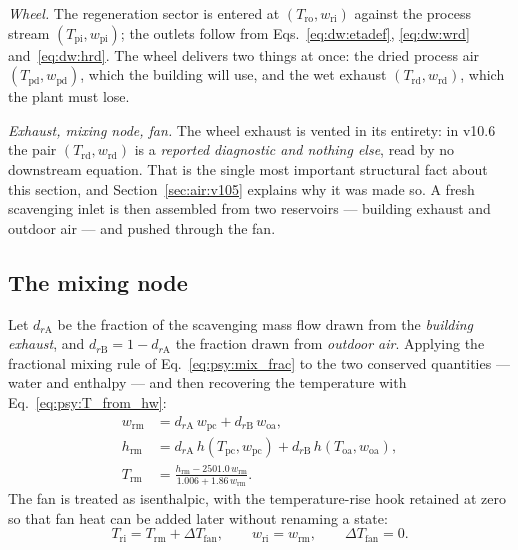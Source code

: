 \documentclass[11pt]{article}
\begin{document}
\emph{Wheel.} The regeneration sector is entered at
$(T_{\mathrm{ro}},w_{\mathrm{ri}})$ against the process stream
$(T_{\mathrm{pi}},w_{\mathrm{pi}})$; the outlets follow from
Eqs.~\eqref{eq:dw:etadef}, \eqref{eq:dw:wrd} and~\eqref{eq:dw:hrd}. The wheel
delivers two things at once: the dried process air
$(T_{\mathrm{pd}},w_{\mathrm{pd}})$, which the building will use, and the wet
exhaust $(T_{\mathrm{rd}},w_{\mathrm{rd}})$, which the plant must lose.

\emph{Exhaust, mixing node, fan.} The wheel exhaust is vented in its entirety:
in v10.6 the pair $(T_{\mathrm{rd}},w_{\mathrm{rd}})$ is a \emph{reported
diagnostic and nothing else}, read by no downstream equation. That is the
single most important structural fact about this section, and
Section~\ref{sec:air:v105} explains why it was made so. A fresh scavenging
inlet is then assembled from two reservoirs --- building exhaust and outdoor
air --- and pushed through the fan.

\subsection{The mixing node}
\label{sec:air:mix}

Let $d_{r\mathrm{A}}$ be the fraction of the scavenging mass flow drawn from
the \emph{building exhaust}, and $d_{r\mathrm{B}}=1-d_{r\mathrm{A}}$ the
fraction drawn from \emph{outdoor air}. Applying the fractional mixing rule
of Eq.~\eqref{eq:psy:mix_frac} to the two conserved quantities --- water and
enthalpy --- and then recovering the temperature with
Eq.~\eqref{eq:psy:T_from_hw}:
\begin{align}
w_{\mathrm{rm}} &= d_{r\mathrm{A}}\,w_{\mathrm{pc}}
                 + d_{r\mathrm{B}}\,w_{\mathrm{oa}},
\label{eq:air:mix_w}\\[2pt]
h_{\mathrm{rm}} &= d_{r\mathrm{A}}\,h(T_{\mathrm{pc}},w_{\mathrm{pc}})
                 + d_{r\mathrm{B}}\,h(T_{\mathrm{oa}},w_{\mathrm{oa}}),
\label{eq:air:mix_h}\\[2pt]
T_{\mathrm{rm}} &= \frac{h_{\mathrm{rm}} - 2501.0\,w_{\mathrm{rm}}}
                        {1.006 + 1.86\,w_{\mathrm{rm}}} .
\label{eq:air:mix_T}
\end{align}
The fan is treated as isenthalpic, with the temperature-rise hook retained at
zero so that fan heat can be added later without renaming a state:
\begin{equation}
T_{\mathrm{ri}} = T_{\mathrm{rm}} + \Delta T_{\mathrm{fan}},
\qquad
w_{\mathrm{ri}} = w_{\mathrm{rm}},
\qquad
\Delta T_{\mathrm{fan}} = 0 .
\label{eq:air:fan}
\end{equation}
\end{document}
